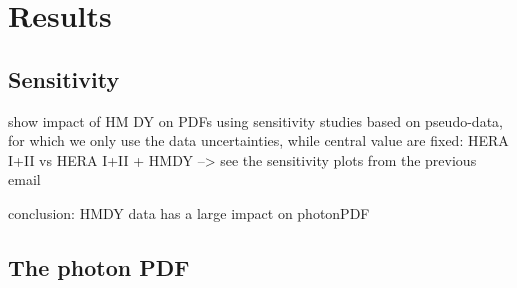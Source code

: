 \section{Results}
\label{sec:results}

\subsection{Sensitivity}
 show impact of HM DY on PDFs using sensitivity studies based on
pseudo-data, for which we only use the data uncertainties, while central 
value are fixed:
 HERA I+II vs HERA I+II + HMDY --> see the sensitivity plots from the previous email


conclusion: HMDY data has a large impact on photonPDF 

\subsection{The photon PDF}

